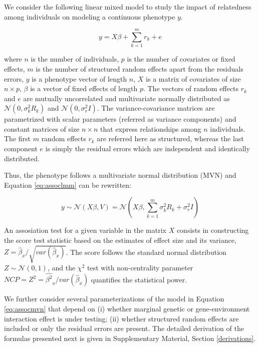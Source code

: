 \documentclass[]{book}
\theoremstyle{definition}
\theoremstyle{definition}
\theoremstyle{definition}
\theoremstyle{remark}
\begin{document}
We consider the following linear mixed model to study the impact of
relatedness among individuals on modeling a continuous phenotype \(y\).

\begin{equation} 
  y = X \beta + \sum_{k=1}^{m}{r_k} + e
\label{eq:assoclmm}
\end{equation}

where \(n\) is the number of individuals, \(p\) is the number of
covariates or fixed effects, \(m\) is the number of structured random
effects apart from the residuals errors, \(y\) is a phenotype vector of
length \(n\), \(X\) is a matrix of covariates of size \(n \times p\),
\(\beta\) is a vector of fixed effects of length \(p\). The vectors of
random effects \(r_k\) and \(e\) are mutually uncorrelated and
multivariate normally distributed as \(\mathcal{N}(0, \sigma^2_k R_k)\)
and \(\mathcal{N}(0, \sigma^2_r I)\). The variance-covariance matrices
are parametrized with scalar parameters (referred as variance
components) and constant matrices of size \(n \times n\) that express
relationships among \(n\) individuals. The first \(m\) random effects
\(r_k\) are referred here as structured, whereas the last component
\(e\) is simply the residual errors which are independent and
identically distributed.

Thus, the phenotype follows a multivariate normal distribution (MVN) and
Equation \eqref{eq:assoclmm} can be rewritten:

\begin{equation} 
  y \sim \mathcal{N} (X \beta, V) = \mathcal{N} (X \beta, \sum_{k=1}^{m}{\sigma_k^2 R_k} + \sigma_r^2 I) 
\label{eq:assocmvn}
\end{equation}

An assosiation test for a given variable in the matrix \(X\) consists in
constructing the score test statistic based on the estimates of effect
size and its variance,
\(Z = \hat{\beta}_x / \sqrt{var(\hat{\beta}_x)}\). The score follows the
standard normal distribution \(Z \sim \mathcal{N}(0, 1)\), and the
\(\chi^2\) test with non-centrality parameter
\(NCP = Z^2 = \hat{\beta^2}_x / var(\hat{\beta}_x)\) quantifies the
statistical power.

We further consider several parameterizations of the model in Equation
\eqref{eq:assocmvn} that depend on (i) whether marginal genetic or
gene-environment interaction effect is under testing; (ii) whether
structured random effects are included or only the residual errors are
present. The detailed derivation of the formulas presented next is given
in Supplementary Material, Section \ref{derivations}.
\end{document}
